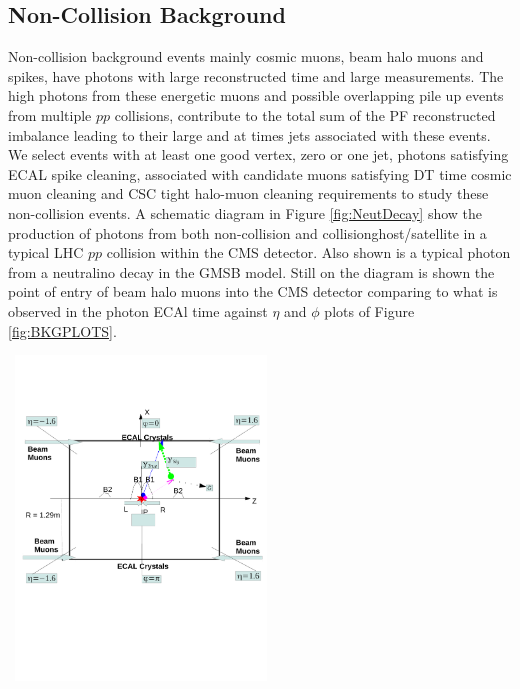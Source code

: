 \subsection{Non-Collision Background}
Non-collision background events mainly cosmic muons, beam halo muons and spikes, have photons with large reconstructed time and large \ETslash\hspace{0.15cm} measurements. The high \pt photons from these energetic muons and possible overlapping  pile up events from multiple $pp$ collisions, contribute to the total sum of the PF reconstructed \pt imbalance leading to their large \ETslash\hspace{0.15cm} and at times jets associated with these events.
We select events with at least one good vertex, zero or one jet, photons satisfying ECAL spike cleaning, associated with candidate muons satisfying DT time cosmic muon cleaning and CSC tight halo-muon cleaning requirements to study these non-collision events. 
A schematic diagram in Figure \ref{fig:NeutDecay} show the production of photons from both non-collision and collision{ghost/satellite} in a typical LHC $pp$ collision within the CMS detector. Also shown is a typical photon from a neutralino decay in the GMSB model. Still on the diagram is shown the point of entry of beam halo muons into the CMS detector comparing to what is observed in the photon ECAl time against $\eta$ and $\phi$ plots of Figure \ref{fig:BKGPLOTS}.
\vspace{5mm}
\begin{minipage}{0.90\linewidth} 
\begin{center}
\captionsetup{type=figure}
\mbox{
\includegraphics[height=0.35\textwidth, width=0.5\textwidth]{THESISPLOTS/Background_Delayed_Photon.pdf}
}
\label{fig:NeutDecay}
\end{center}
\end{minipage} 

